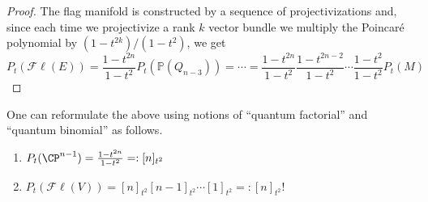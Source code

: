 \documentclass[11pt,leqno,oneside]{amsbook}
\renewcommand{\P}{\mathbb{P}}
\numberwithin{thm}{section}
\newcommand{\Fl}{\mathcal{F\ell}}
\begin{document}
\begin{proof}
  The flag manifold is constructed by a sequence of projectivizations
  and, since each time we projectivize a rank \(k\) vector bundle we
  multiply the Poincar\'{e} polynomial by \((1-t^{2k})/(1-t^2)\), we
  get \[
    P_t(\Fl(E)) = \frac{1-t^{2n}}{1-t^2} P_t(\P(Q_{n-3})) = \cdots =
    \frac{1-t^{2n}}{1-t^2} \frac{1-t^{2n-2}}{1-t^2} \cdots \frac{1-t^2}{1-t^2} P_t(M)
  \]
\end{proof}
\begin{rmk}
  One can reformulate the above using notions of ``quantum factorial''
  and ``quantum binomial'' as follows.
  \begin{enumerate}
  \item \(P_t(\CP^{n-1}) = \frac{1-t^{2n}}{1-t^2} =: [n]_{t^2}\)
  \item \(P_t(\Fl(V)) = [n]_{t^2} [n-1]_{t^2} \cdots [1]_{t^2} =: [n]_{t^2}!\)
  \end{enumerate}
\end{rmk}
\end{document}
